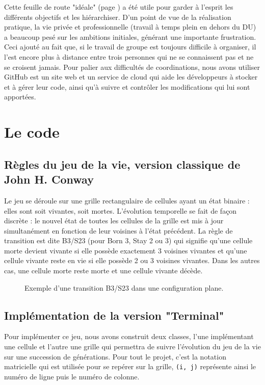 \documentclass[11pt]{article}
\begin{document}
Cette feuille de route "idéale" (page \pageref{feuille}) a été utile pour garder à l'esprit les différents objectifs et les hiérarchiser. D'un point de vue de la réalisation pratique, la vie privée et professionnelle (travail à temps plein en dehors du DU) a beaucoup pesé sur les ambitions initiales, générant une importante frustration. Ceci ajouté au fait que, si le travail de groupe est toujours difficile à organiser, il l'est encore plus à distance entre trois personnes qui ne se connaissent pas et ne se croisent jamais. Pour palier aux difficultés de coordinations, nous avons utiliser GitHub est un site web et un service de cloud qui aide les développeurs à stocker et à gérer leur code, ainsi qu’à suivre et contrôler les modifications qui lui sont apportées.


\section{Le code}

\subsection{Règles du jeu de la vie, version classique de John H. Conway}

Le jeu se déroule sur une grille rectangulaire de cellules ayant un état binaire : elles sont soit vivantes, soit mortes. L'évolution temporelle se fait de façon discrète : le nouvel état de toutes les cellules de la grille est mis à jour simultanément en fonction de leur voisines à l'état précédent. La règle de transition est dite B3/S23 (pour Born 3, Stay 2 ou 3) qui signifie qu'une cellule morte devient vivante si elle possède exactement 3 voisines vivantes et qu'une cellule vivante reste en vie si elle possède 2 ou 3 voisines vivantes. Dans les autres cas, une cellule morte reste morte et une cellule vivante décède.

\begin{figure}[h]
    \centering%
    
    \caption{\label{fig:transition}Exemple d'une transition B3/S23 dans une configuration plane.}
\end{figure}

\subsection{Implémentation de la version "Terminal"}

Pour implémenter ce jeu, nous avons construit deux classes, l'une implémentant une cellule et l'autre une grille qui permettra de suivre l'évolution du jeu de la vie sur une succession de générations. Pour tout le projet, c'est la notation matricielle qui est utilisée pour se repérer sur la grille, \texttt{(i, j)} représente ainsi le numéro de ligne puis le numéro de colonne.
\end{document}
